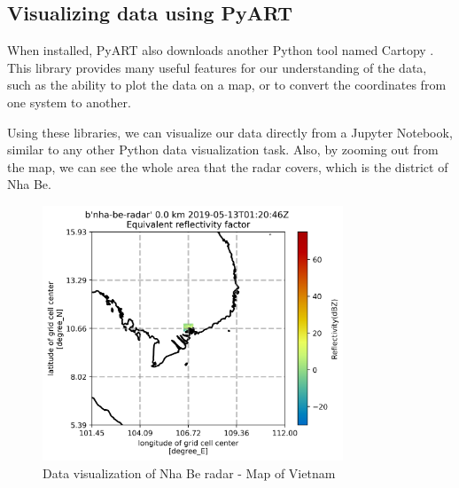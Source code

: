 \subsection{Visualizing data using PyART}
When installed, PyART also downloads another Python tool named Cartopy \cite{Cartopy}. This library provides many useful features
for our understanding of the data, such as the ability to plot the data on a map, or to convert the coordinates from one system to another.

Using these libraries, we can visualize our data directly from a Jupyter Notebook, similar to any other Python data visualization task. Also, by zooming out from the map, we can see the whole area that the radar covers, which is the district of Nha Be.

\begin{figure}[H]
    \centering
    \includegraphics[width=0.8\textwidth]{Images/3.1-nha-be-radar-visualize-far.png}
    \caption{Data visualization of Nha Be radar - Map of Vietnam}
    \label{fig:nha-be-viz-far}
\end{figure}

